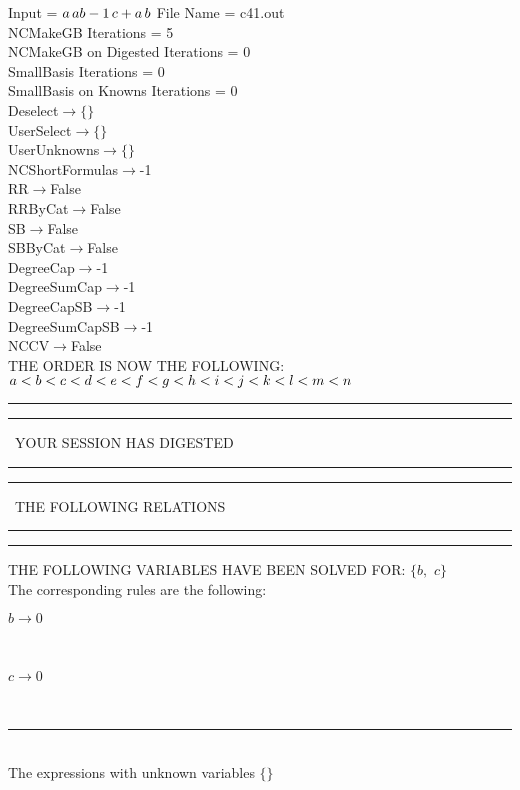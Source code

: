 \documentclass[rep10,leqno]{report}
\begin{document}
\normalsize
\baselineskip=12pt
\noindent
Input = 
$
\\a\,
 a\\
b\\
-1\,
 c + a\,
 b\\
$
File Name = c41.out\\
NCMakeGB Iterations = 5\\
NCMakeGB on Digested Iterations = 0\\
SmallBasis Iterations = 0\\
SmallBasis on Knowns Iterations = 0\\
Deselect$\rightarrow \{\}$\\
UserSelect$\rightarrow \{\}$\\
UserUnknowns$\rightarrow \{\}$\\
NCShortFormulas$\rightarrow$-1\\
RR$\rightarrow $False\\
RRByCat$\rightarrow $False\\
SB$\rightarrow $False\\
SBByCat$\rightarrow $False\\
DegreeCap$\rightarrow $-1\\
DegreeSumCap$\rightarrow $-1\\
DegreeCapSB$\rightarrow $-1\\
DegreeSumCapSB$\rightarrow $-1\\
NCCV$\rightarrow $False\\
THE ORDER IS NOW THE FOLLOWING:\hfil\break
$
a<b<c<d<e<f<g<h<i<j<k<l<m<n\\
$
\rule[2pt]{6in}{4pt}\hfil\break
\rule[2pt]{1.879in}{4pt}
\ YOUR SESSION HAS DIGESTED\ 
\rule[2pt]{1.879in}{4pt}\hfil\break
\rule[2pt]{1.923in}{4pt}
\ THE FOLLOWING RELATIONS\ 
\rule[2pt]{1.923in}{4pt}\hfil\break
\rule[2pt]{6in}{4pt}\hfil\break
THE FOLLOWING VARIABLES HAVE BEEN SOLVED FOR:\hfil\break
$\{b,
$ $
c\}$
\smallskip\\
The corresponding rules are the following:\smallskip\\
\begin{minipage}{6in}
$
b\rightarrow 0
$
\end{minipage}\medskip\\
\begin{minipage}{6in}
$
c\rightarrow 0
$
\end{minipage}\medskip\\
\rule[3pt]{6in}{.7pt}\\
The expressions with unknown variables $\{\}$\\
\end{document}
